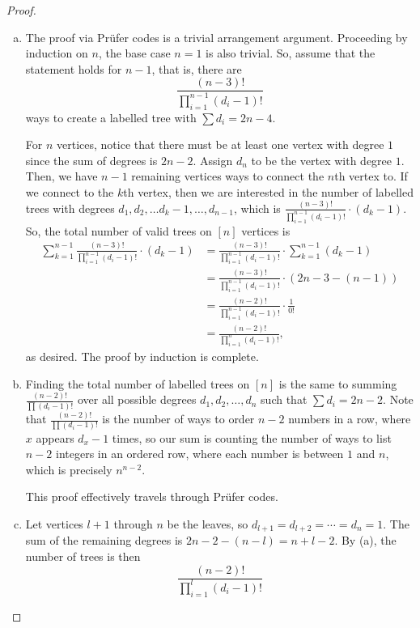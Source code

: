 \documentclass[11pt]{article}
\begin{document}
\begin{proof}
    \begin{enumerate}[(a)]
        \item The proof via Prüfer codes is a trivial arrangement argument. Proceeding by induction on $n$, the base case $n=1$ is also trivial. So, assume that the statement holds for $n-1$, that is, there are \[\frac{(n-3)!}{\prod_{i=1}^{n-1}(d_i-1)!}\] ways to create a labelled tree with $\sum d_i=2n-4$.

        For $n$ vertices, notice that there must be at least one vertex with degree $1$ since the sum of degrees is $2n-2$. Assign $d_n$ to be the vertex with degree $1$. Then, we have $n-1$ remaining vertices ways to connect the $n$th vertex to. If we connect to the $k$th vertex, then we are interested in the number of labelled trees with degrees $d_1,d_2,\dots d_k-1,\dots,d_{n-1}$, which is $\frac{(n-3)!}{\prod_{i=1}^{n-1}(d_i-1)!}\cdot (d_k-1)$. So, the total number of valid trees on $[n]$ vertices is
        \begin{align*}
            \sum_{k=1}^{n-1}\frac{(n-3)!}{\prod_{i=1}^{n-1}(d_i-1)!}\cdot (d_k-1)&=\frac{(n-3)!}{\prod_{i=1}^{n-1}(d_i-1)!}\cdot\sum_{k=1}^{n-1}(d_k-1)\\
            &=\frac{(n-3)!}{\prod_{i=1}^{n-1}(d_i-1)!}\cdot(2n-3-(n-1))\\
            &=\frac{(n-2)!}{\prod_{i=1}^{n-1}(d_i-1)!}\cdot\frac{1}{0!}\\
            &=\frac{(n-2)!}{\prod_{i=1}^n(d_i-1)!},
        \end{align*}
        as desired. The proof by induction is complete.
        \item Finding the total number of labelled trees on $[n]$ is the same to summing $\frac{(n-2)!}{\prod(d_i-1)!}$ over all possible degrees $d_1,d_2,\dots,d_n$ such that $\sum d_i=2n-2$. Note that $\frac{(n-2)!}{\prod(d_i-1)!}$ is the number of ways to order $n-2$ numbers in a row, where $x$ appears $d_x-1$ times, so our sum is counting the number of ways to list $n-2$ integers in an ordered row, where each number is between $1$ and $n$, which is precisely $n^{n-2}$.

        This proof effectively travels through Prüfer codes.
        \item Let vertices $l+1$ through $n$ be the leaves, so $d_{l+1}=d_{l+2}=\cdots=d_n=1$. The sum of the remaining degrees is $2n-2-(n-l)=n+l-2$. By (a), the number of trees is then \[\frac{(n-2)!}{\prod_{i=1}^l (d_i-1)!}\]
    \end{enumerate}
\end{proof}
\end{document}

